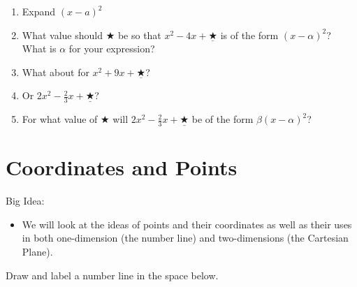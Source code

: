 \bq \begin{enumerate}
\item Expand $(x-a)^2$
\item What value should $\bigstar$ be so that $x^2-4x +\underline{\bigstar}$ is of the form $(x-\alpha)^2$? What is $\alpha$ for your expression?
\item What about for $x^2+9x+\underline{\bigstar}$?
\item Or $2x^2-\frac{2}{3}x+\underline{\bigstar}$?
\item For what value of $\bigstar$ will $2x^2-\frac{2}{3}x+\underline{\bigstar}$ be of the form $\beta(x-\alpha)^2$?
\end{enumerate}
\eq






\section{Coordinates and Points}
Big Idea:
\begin{itemize}
\item We will look at the ideas of points and their coordinates as well as their uses in both one-dimension (the number line) and two-dimensions (the Cartesian Plane).
\end{itemize}

\bq\label{q1} Draw and label a number line in the space below.

\vspace{1.5in}

